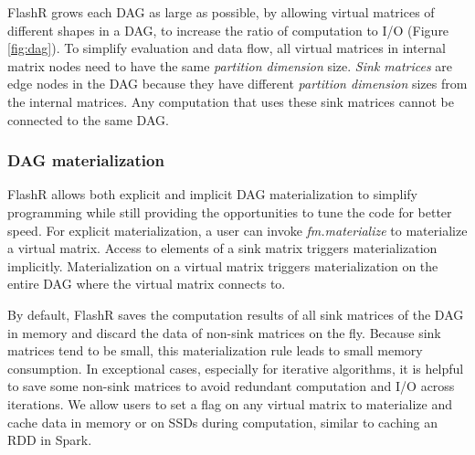 FlashR grows each DAG as large as possible, by allowing virtual matrices
of different shapes in a DAG, to increase the ratio of computation to I/O
(Figure \ref{fig:dag}). To simplify evaluation and data flow, 
all virtual matrices in internal matrix nodes need to have the same
\textit{partition dimension} size. \textit{Sink matrices} are edge nodes
in the DAG because they have different \textit{partition dimension} sizes
from the internal matrices. Any computation that uses these
sink matrices cannot be connected to the same DAG.  

\subsubsection{DAG materialization}
FlashR allows both explicit and implicit DAG materialization to simplify
programming while still providing the opportunities to tune the code for
better speed. For explicit materialization, a user can invoke
\textit{fm.materialize} to materialize a virtual matrix. Access to elements
of a sink matrix triggers materialization implicitly. Materialization on
a virtual matrix triggers materialization on the entire DAG where the virtual
matrix connects to.

By default, FlashR saves the computation results of all sink matrices of
the DAG in memory and discard the data of non-sink matrices on the fly.
Because sink matrices tend to be small, this materialization
rule leads to small memory consumption.
In exceptional cases, especially for iterative algorithms,
it is helpful to save some non-sink matrices to avoid
redundant computation and I/O across iterations.  We allow users to
set a flag on any virtual matrix to materialize and cache data in memory
or on SSDs during computation, similar to caching an RDD in Spark.

